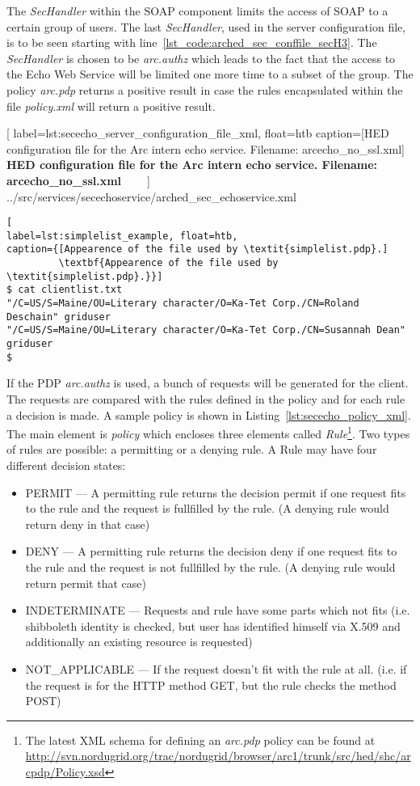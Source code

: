The \textit{SecHandler} within the SOAP component limits the access of SOAP to a certain group of users.
%
%
The last \textit{SecHandler}, used in the server configuration file, is to be seen starting with line~\ref{lst_code:arched_sec_conffile_secH3}. The \textit{SecHandler} is chosen to be \textit{arc.authz} which leads to the fact that the access to the Echo Web Service will be limited one more time to a subset of the group. The policy \textit{arc.pdp} returns a positive result in case the rules encapsulated within the file \textit{policy.xml} will return a positive result.\\

	[
	label=lst:sececho_server_configuration_file_xml, float=htb
	caption={[HED configuration file for the Arc intern echo service. Filename: arcecho\_no\_ssl.xml]
	\textbf{HED configuration file for the Arc intern echo service. Filename: arcecho\_no\_ssl.xml\textcolor{white}{hmf}}}
	]
{../src/services/secechoservice/arched_sec_echoservice.xml}



\begin{lstlisting}[
label=lst:simplelist_example, float=htb,
caption={[Appearence of the file used by \textit{simplelist.pdp}.]
         \textbf{Appearence of the file used by \textit{simplelist.pdp}.}}]
$ cat clientlist.txt
"/C=US/S=Maine/OU=Literary character/O=Ka-Tet Corp./CN=Roland Deschain" griduser
"/C=US/S=Maine/OU=Literary character/O=Ka-Tet Corp./CN=Susannah Dean" griduser
$
\end{lstlisting}

If the PDP \textit{arc.authz} is used, a bunch of requests will be generated for the client. The requests are compared with the rules defined in the policy and for each rule a decision is made.
A sample policy is shown in Listing~\ref{lst:sececho_policy_xml}. The main element is \textit{policy} which encloses three elements called \textit{Rule}\footnote{The latest XML schema for defining an \textit{arc.pdp} policy can be found at \url{http://svn.nordugrid.org/trac/nordugrid/browser/arc1/trunk/src/hed/shc/arcpdp/Policy.xsd}}. 
Two types of rules are possible: a permitting or a denying rule.
A Rule may have four different decision states:
\begin{itemize}
 \item PERMIT --- A permitting rule returns the decision permit if one request fits to the rule and 
the request is fullfilled by the rule. (A denying rule would return deny in that case)
 \item DENY --- A permitting rule returns the decision deny if one request fits to the rule  and the request is not fullfilled by the rule. (A denying rule would return permit that case)
 \item INDETERMINATE --- Requests and rule have some parts which not fits
(i.e. shibboleth identity is checked, but user has identified himself via X.509 and additionally an existing resource is requested)
 \item NOT\_APPLICABLE --- If the request doesn't fit with the rule at all. (i.e. if the 
request is for the HTTP method GET, but the rule checks the method POST)
\end{itemize}
\forcelinebreak

